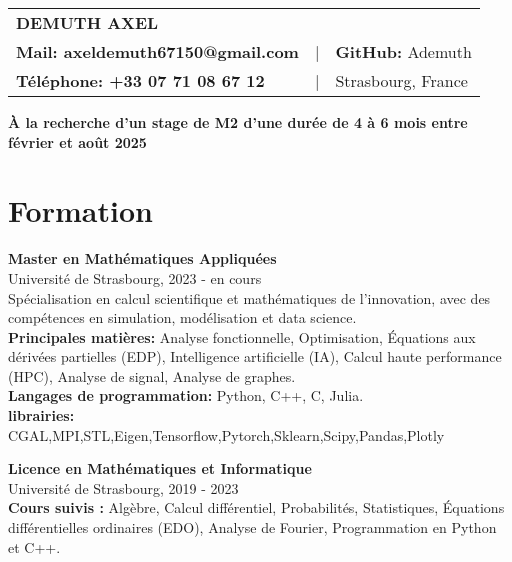 \documentclass[a4paper,10pt]{article}
\begin{document}
\begin{center}
    \begin{tabular}{>{\bfseries}l c l}
        \textbf{\LARGE DEMUTH AXEL} & & \\[0.3cm]
        \textbf{Mail:} axeldemuth67150@gmail.com & | & \textbf{GitHub:} Ademuth \\[0.1cm]
        \textbf{Téléphone:} +33 07 71 08 67 12 & | & Strasbourg, France
    \end{tabular}
\end{center}

\vspace{0.5cm}

\begin{center}
    \textbf{À la recherche d'un stage de M2 d'une durée de 4 à 6 mois entre février et août 2025}
\end{center}

\vspace{0.5cm}

\section*{Formation}
\noindent
\textbf{Master en Mathématiques Appliquées} \\
Université de Strasbourg, 2023 - en cours \\
Spécialisation en calcul scientifique et mathématiques de l'innovation, avec des compétences en simulation, modélisation et data science. \\

\noindent
\textbf{Principales matières:} Analyse fonctionnelle, Optimisation, Équations aux dérivées partielles (EDP), Intelligence artificielle (IA), Calcul haute performance (HPC), Analyse de signal, Analyse de graphes. \\

\noindent
\textbf{Langages de programmation:} Python, C++, C, Julia. \\
\textbf{librairies:} CGAL,MPI,STL,Eigen,Tensorflow,Pytorch,Sklearn,Scipy,Pandas,Plotly
\vspace{0.2cm} 
\vspace{0.1cm}

\noindent
\textbf{Licence en Mathématiques et Informatique} \\
Université de Strasbourg, 2019 - 2023 \\
\noindent
\textbf{Cours suivis :} Algèbre, Calcul différentiel, Probabilités, Statistiques, Équations différentielles ordinaires (EDO), Analyse de Fourier, Programmation en Python et C++. \\
\end{document}
